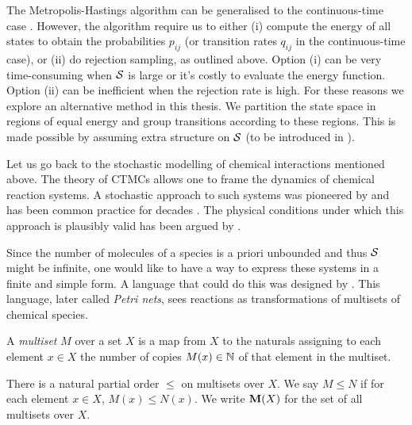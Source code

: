 The Metropolis-Hastings algorithm can be generalised
to the continuous-time case \citep{diaconis}.
However, the algorithm require us to either
(i) compute the energy of all states to obtain the probabilities
$p_{ij}$ (or transition rates $q_{ij}$ in the continuous-time case),
or (ii) do rejection sampling, as outlined above.
Option (i) can be very time-consuming when $\mathcal{S}$ is large
or it's costly to evaluate the energy function.
Option (ii) can be inefficient when the rejection rate is high.
For these reasons we explore an alternative method in this thesis.
We partition the state space in regions of equal energy
and group transitions according to these regions.
This is made possible by assuming extra structure on $\mathcal{S}$
(to be introduced in ).

Let us go back to the stochastic modelling of
chemical interactions mentioned above.
The theory of CTMCs allows one to frame
the dynamics of chemical reaction systems.
A stochastic approach to such systems
was pioneered by \citet{delbruck}
and has been common practice for decades
\citep{mcquarrie-stoch-kinetics}.
The physical conditions under which this approach is plausibly valid
has been argued by \citet{gillespie76}.

Since the number of molecules of a species
is a priori unbounded and thus $\mathcal{S}$ might be infinite,
one would like to have a way to express
these systems in a finite and simple form.
A language that could do this was designed by \citet{petri}.
This language, later called \emph{Petri nets},
sees reactions as transformations of
multisets of chemical species.

\begin{definition}
  A \emph{multiset} $M$ over a set $X$ is a map from $X$ to
  the naturals assigning to each element $x \in X$
  the number of copies $M(x) \in \mathbb{N}$ of that element
  in the multiset.
\end{definition}

There is a natural partial order $\leqslant$ on multisets over $X$.
We say $M \leqslant N$ if for each element $x \in X$,
$M(x) \leqslant N(x)$.
We write $\mathbf{M}(X)$ for the set of all multisets over $X$.


